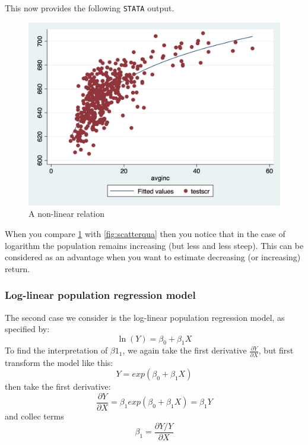 \documentclass[
]{book}
\begin{document}
This now provides the following \texttt{STATA} output.

\begin{figure}

{\centering \includegraphics[width=600px]{./figures/scatterlnincome} 

}

\caption{A non-linear relation}\label{fig:scatterlnincome}
\end{figure}

When you compare \ref{fig:scatterlnincome} with \ref{fig:scatterqua} then you notice that in the case of logarithm the population remains increasing (but less and less steep). This can be considered as an advantage when you want to estimate decreasing (or increasing) return.

\hypertarget{log-linear-population-regression-model}{%
\subsubsection{Log-linear population regression model}\label{log-linear-population-regression-model}}

The second case we consider is the log-linear population regression model, as specified by:
\begin{equation}
    \ln(Y) = \beta_0 + \beta_1 X
\end{equation}
To find the interpretation of \(\beta1_1\), we again take the first derivative \(\frac{\partial Y}{\partial X}\), but first transform the model like this:
\begin{equation}
    Y = exp( \beta_0 + \beta_1 X )
\end{equation}
then take the first derivative:
\begin{equation}
    \frac{\partial Y}{\partial X} = \beta_1  exp( \beta_0 + \beta_1 X ) = \beta_1 Y
\end{equation}
and collec terms
\begin{equation}
    \beta_1  = \frac{\partial Y / Y}{\partial X } 
\end{equation}
\end{document}
